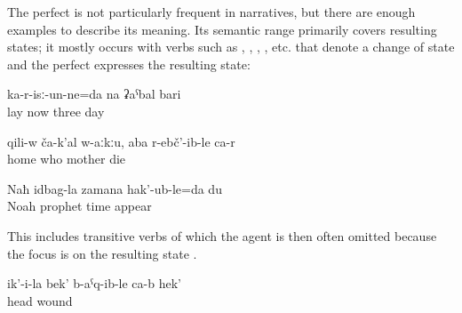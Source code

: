 The perfect is not particularly frequent in narratives, but there are enough examples to describe its meaning. Its semantic range primarily covers resulting states; it mostly occurs with verbs such as , , , , etc. that denote a change of state and the perfect expresses the resulting state:
%
\begin{exe}
	\ex	\label{ex:I have been lying (in the hospital) for three days analytic}
	\gll	ka-r-isː-un-ne=da	na	ʡaˁbal	bari\\
		lay	now	three	day\\
	\glt	{}

	\ex	\label{ex:There is nobody at home, my mother has died analytic}
	\gll	qili-w	ča-k'al	w-aːkːu,	aba	r-ebč'-ib-le	ca-r\\
		home	who		mother	die	\\
	\glt	{}

	\ex	\label{ex:I was born at the time of the prophet Noah}
	\gll	Naħ	idbag-la	zamana	hak'-ub-le=da	du\\
		Noah	prophet	time	appear	\\
	\glt	{}
\end{exe}

This includes transitive verbs of which the agent is then often omitted because the focus is on the resulting state .
%
\begin{exe}
	\ex	\label{ex:Her head has been wounded}
	\gll	ik'-i-la	bek'	b-aˁq-ib-le	ca-b	hek'\\
			head	wound		\\
	\glt	{}
\end{exe}

